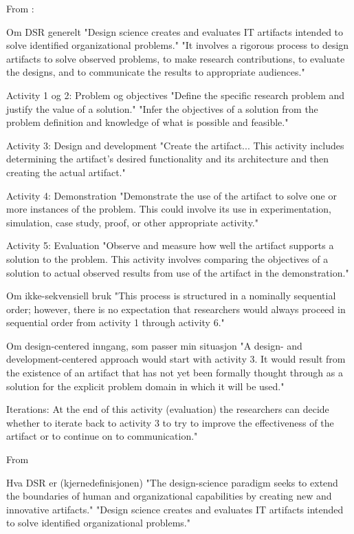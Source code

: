 From \parencite{peffers2007design_science_research_methodology}:

Om DSR generelt
"Design science creates and evaluates IT artifacts intended to solve identified organizational problems."
"It involves a rigorous process to design artifacts to solve observed problems, to make research contributions, to evaluate the designs, and to communicate the results to appropriate audiences."

Activity 1 og 2: Problem og objectives
"Define the specific research problem and justify the value of a solution."
"Infer the objectives of a solution from the problem definition and knowledge of what is possible and feasible."

Activity 3: Design and development
"Create the artifact... This activity includes determining the artifact's desired functionality and its architecture and then creating the actual artifact."

Activity 4: Demonstration
"Demonstrate the use of the artifact to solve one or more instances of the problem. This could involve its use in experimentation, simulation, case study, proof, or other appropriate activity."

Activity 5: Evaluation
"Observe and measure how well the artifact supports a solution to the problem. This activity involves comparing the objectives of a solution to actual observed results from use of the artifact in the demonstration."

Om ikke-sekvensiell bruk
"This process is structured in a nominally sequential order; however, there is no expectation that researchers would always proceed in sequential order from activity 1 through activity 6."

Om design-centered inngang, som passer min situasjon
"A design- and development-centered approach would start with activity 3. It would result from the existence of an artifact that has not yet been formally thought through as a solution for the explicit problem domain in which it will be used."

Iterations:
At the end of this activity (evaluation) the researchers can decide whether to iterate back to activity 3 to try to improve the effectiveness of the artifact or to continue on to communication."

From \parencite{hevner2004design_science_information_systems_research}

Hva DSR er (kjernedefinisjonen)
"The design-science paradigm seeks to extend the boundaries of human and organizational capabilities by creating new and innovative artifacts."
"Design science creates and evaluates IT artifacts intended to solve identified organizational problems."

